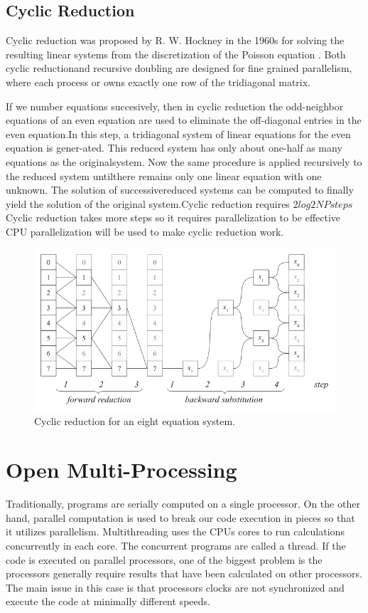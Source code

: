 \documentclass[12pt, oneside]{book}
\theoremstyle{plain}
\theoremstyle{definition}
\begin{document}
\subsection{Cyclic Reduction}\label{cyclic}
Cyclic reduction was proposed by R. W. Hockney in the 1960s for solving the resulting linear systems from the  discretization of the Poisson equation \cite{Hockney}. 
Both cyclic reductionand recursive doubling are designed for fine grained parallelism, where each process or owns exactly one row of the tridiagonal matrix. 

If we number equations succesively, then in cyclic reduction the odd-neighbor equations of an even equation are used to eliminate the off-diagonal entries in the even equation.In this step, a tridiagonal system of linear equations for the even equation is gener-ated. This reduced system has only about one-half as many equations as the originalsystem. Now the same procedure is applied recursively to the reduced system untilthere remains only one linear equation with one unknown. The solution of successivereduced systems can be computed to finally yield the solution of the original system.Cyclic reduction requires $2log2NPsteps$
Cyclic reduction takes more steps so it requires parallelization to be effective CPU parallelization will be used to make cyclic reduction work.

\begin{figure}[!htb]
    \centering
        \includegraphics[scale=0.8]{cyclic.png}
    \caption{Cyclic reduction for an eight equation system.}
\end{figure}

\section{Open Multi-Processing}
Traditionally, programs are serially computed on a single processor. On the other hand, parallel computation is used to break our code execution in pieces so that it utilizes parallelism. Multithreading uses the CPUs cores to run calculations concurrently in each core. The concurrent programs are called a thread. If the code is executed on parallel processors, one of the biggest problem is the processors generally require results that have been calculated on other processors. The main issue in this case is that processors clocks are not synchronized and execute the code at minimally different speeds.
\end{document}
